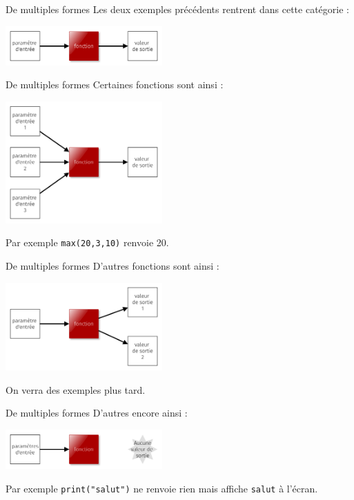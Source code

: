 \documentclass[10pt]{beamer}
\begin{document}
    \begin{frame}{De multiples formes}
        Les deux exemples précédents rentrent dans cette catégorie :
        \begin{center}
            \includegraphics[width=6cm]{img/fonction1.png}
        \end{center}
    \end{frame}
    \begin{frame}{De multiples formes}
        Certaines fonctions sont ainsi :
        \begin{center}
            \includegraphics[width=6cm]{img/fonction2.png}
        \end{center}\pause
    Par exemple \texttt{max(20,3,10)} renvoie 20.
    \end{frame}
    \begin{frame}{De multiples formes}
        D'autres fonctions sont ainsi :
        \begin{center}
            \includegraphics[width=6cm]{img/fonction3.png}
        \end{center}\pause
        On verra des exemples plus tard.
    \end{frame}
    \begin{frame}{De multiples formes}
        D'autres encore ainsi :
        \begin{center}
            \includegraphics[width=6cm]{img/fonction4.png}
        \end{center}\pause
        Par exemple \texttt{print("salut")} ne renvoie rien mais affiche \texttt{salut} à l'écran.
    \end{frame}
\end{document}
